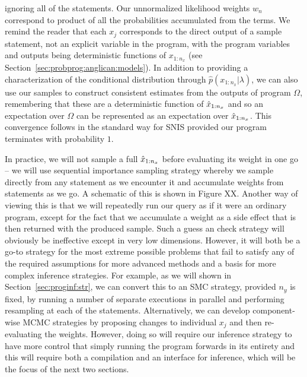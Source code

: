 ignoring all of the \observe statements.  Our unnormalized likelihood weights $w_n$ correspond to
product of all the probabilities accumulated from the \observe terms.  We remind the reader that each 
$x_j$ corresponds to the direct output of a sample statement, not an explicit variable in the program, 
with the program variables and outputs being deterministic functions of $x_{1:n_x}$ (see 
Section~\ref{sec:probprog:anglican:models}). In addition to providing a 
characterization of the conditional distribution through $\hat{p}(x_{1:n_x} | \lambda)$, we can also
use our samples to construct consistent estimates from the outputs of program $\Omega$, remembering
that these are a deterministic function of $\hat{x}_{1:n_x}$ and so an expectation over $\Omega$ can be
represented as an expectation over $\hat{x}_{1:n_x}$.
This convergence follows in the standard way for SNIS provided our program terminates with probability $1$.

In practice, we will not sample a full $\hat{x}_{1:n_x}$ before evaluating its weight in one go -- we will use
sequential importance sampling strategy whereby we sample directly from any \sample statement as we encounter it
and accumulate weights from \observe statements as we go.  A schematic of this is shown in
Figure XX.  Another way of viewing this is that we will repeatedly run our query as if it were an ordinary
program, except for the fact that we accumulate a weight as a side effect that is then returned with
the produced sample.  Such a guess an check strategy will obviously be ineffective except in very low
dimensions.  However, it will both be a go-to strategy for the most extreme possible problems that
fail to satisfy any of the required assumptions for more advanced methods and a basis for more complex 
inference strategies.  For example, as we will shown in Section~\ref{sec:proginf:str}, we can
convert this to an SMC strategy, provided $n_y$ is fixed, by running a number of separate executions
in parallel and performing resampling at each of the \observe statements.  Alternatively, we can
develop component-wise MCMC strategies by proposing changes to individual $x_j$ and then
re-evaluating the weights.  However, doing so will require our inference strategy to have more
control that simply running the program forwards in its entirety and this will require both a compilation
and an interface for inference, which will be the focus of the next two sections.